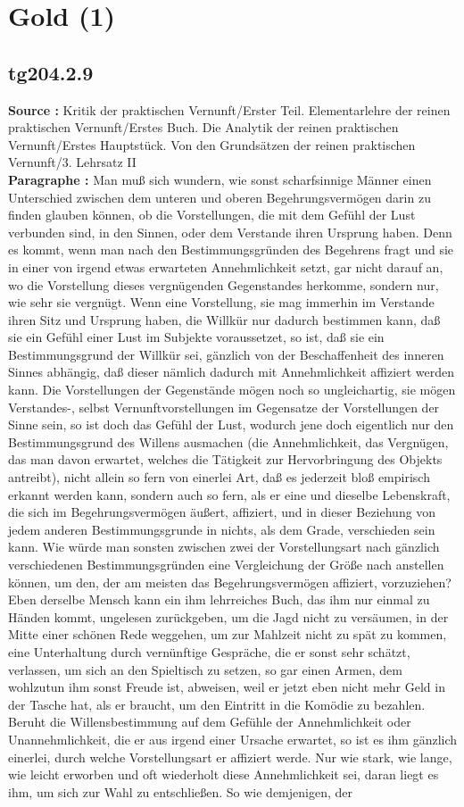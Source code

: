 \documentclass[a4paper,12pt,twoside]{book}
\newcommand{\unnumberedsection}[1]{
	\section*{#1}
	\addcontentsline{toc}{section}{#1}
	\markright{#1}
}
\begin{document}
	\unnumberedsection{Gold (1)} 
	\subsection*{tg204.2.9} 
	\textbf{Source : }Kritik der praktischen Vernunft/Erster Teil. Elementarlehre der reinen praktischen Vernunft/Erstes Buch. Die Analytik der reinen praktischen Vernunft/Erstes Hauptstück. Von den Grundsätzen der reinen praktischen Vernunft/3. Lehrsatz II\\  
	
	\textbf{Paragraphe : }Man muß sich wundern, wie sonst scharfsinnige Männer einen Unterschied zwischen dem unteren und oberen Begehrungsvermögen darin zu finden glauben können, ob die Vorstellungen, die mit dem Gefühl der Lust verbunden sind, in den Sinnen, oder dem Verstande ihren Ursprung haben. Denn es kommt, wenn man nach den Bestimmungsgründen des Begehrens fragt und sie in einer von irgend etwas erwarteten Annehmlichkeit setzt, gar nicht darauf an, wo die Vorstellung dieses vergnügenden Gegenstandes herkomme, sondern nur, wie sehr sie vergnügt. Wenn eine Vorstellung, sie mag immerhin im Verstande ihren Sitz und Ursprung haben, die Willkür nur dadurch bestimmen  kann, daß sie ein Gefühl einer Lust im Subjekte voraussetzet, so ist, daß sie ein Bestimmungsgrund der Willkür sei, gänzlich von der Beschaffenheit des inneren Sinnes abhängig, daß dieser nämlich dadurch mit Annehmlichkeit affiziert werden kann. Die Vorstellungen der Gegenstände mögen noch so ungleichartig, sie mögen Verstandes-, selbst Vernunftvorstellungen im Gegensatze der Vorstellungen der Sinne sein, so ist doch das Gefühl der Lust, wodurch jene doch eigentlich nur den Bestimmungsgrund des Willens ausmachen (die Annehmlichkeit, das Vergnügen, das man davon erwartet, welches die Tätigkeit zur Hervorbringung des Objekts antreibt), nicht allein so fern von einerlei Art, daß es jederzeit bloß empirisch erkannt werden kann, sondern auch so fern, als er eine und dieselbe Lebenskraft, die sich im Begehrungsvermögen äußert, affiziert, und in dieser Beziehung von jedem anderen Bestimmungsgrunde in nichts, als dem Grade, verschieden sein kann. Wie würde man sonsten zwischen zwei der Vorstellungsart nach gänzlich verschiedenen Bestimmungsgründen eine Vergleichung der Größe nach anstellen können, um den, der am meisten das Begehrungsvermögen affiziert, vorzuziehen? Eben derselbe Mensch kann ein ihm lehrreiches Buch, das ihm nur einmal zu Händen kommt, ungelesen zurückgeben, um die Jagd nicht zu versäumen, in der Mitte einer schönen Rede weggehen, um zur Mahlzeit nicht zu spät zu kommen, eine Unterhaltung durch vernünftige Gespräche, die er sonst sehr schätzt, verlassen, um sich an den Spieltisch zu setzen, so gar einen Armen, dem wohlzutun ihm sonst Freude ist, abweisen, weil er jetzt eben nicht mehr Geld in der Tasche hat, als er braucht, um den Eintritt in die Komödie zu bezahlen. Beruht die Willensbestimmung auf dem Gefühle der Annehmlichkeit oder Unannehmlichkeit, die er aus irgend einer Ursache erwartet, so ist es ihm gänzlich einerlei, durch welche Vorstellungsart er affiziert werde. Nur wie stark, wie lange, wie leicht erworben und oft wiederholt diese Annehmlichkeit sei, daran liegt es ihm, um sich zur Wahl zu entschließen. So wie demjenigen, der 
\end{document}
